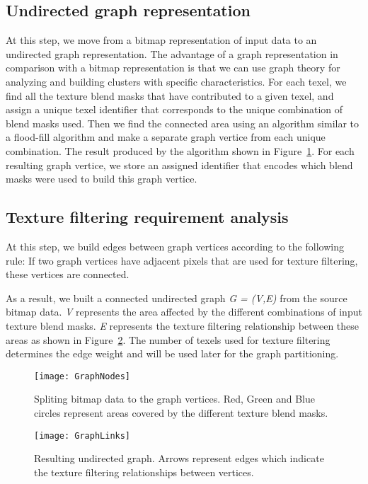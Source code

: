\subsection{Undirected graph representation}

At this step, we move from a bitmap representation of input data to an undirected graph representation.
The advantage of a graph representation in comparison with a bitmap representation is that we can use graph theory for analyzing and building clusters with specific characteristics.
For each texel, we find all the texture blend masks that have contributed to a given texel, and assign a unique texel identifier that corresponds to the unique combination of blend masks used.
Then we find the connected area using an algorithm similar to a flood-fill algorithm and make a separate graph vertice from each unique combination.
The result produced by the algorithm shown in Figure~\ref{Makeev-GraphVertices}.
For each resulting graph vertice, we store an assigned identifier that encodes which blend masks were used to build this graph vertice.

\subsection{Texture filtering requirement analysis}

At this step, we build edges between graph vertices according to the following rule:
If two graph vertices have adjacent pixels that are used for texture filtering, these vertices are connected.

As a result, we built a connected undirected graph \emph{G = (V,E)} from the source bitmap data.
\emph{V} represents the area affected by the different combinations of input texture blend masks.
\emph{E} represents the texture filtering relationship between these areas as shown in Figure~\ref{Makeev-GraphLinks}.
The number of texels used for texture filtering determines the edge weight and will be used later for the graph partitioning.

\begin{figure}\centering
\texttt{[image: GraphNodes]}
\caption{
Spliting bitmap data to the graph vertices.
Red, Green and Blue circles represent areas covered by the different texture blend masks.
}
\label{Makeev-GraphVertices}
\end{figure}


\begin{figure}\centering
\texttt{[image: GraphLinks]}
\caption{
Resulting undirected graph.
Arrows represent edges which indicate the texture filtering relationships between vertices.
}
\label{Makeev-GraphLinks}
\end{figure}


